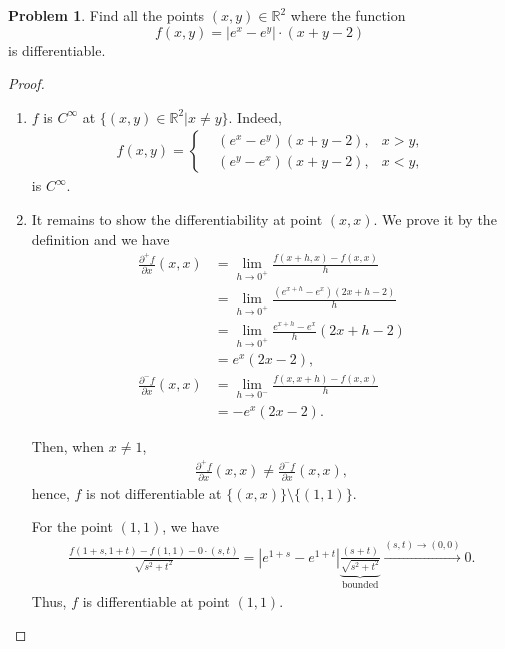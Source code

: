 \documentclass[11pt]{article}
\theoremstyle{definition}
\newtheorem{problem}{Problem}
\theoremstyle{definition}
\begin{document}
\medskip

\begin{problem}
Find all the points $(x,y)\in\mathbb{R}^2$ where the function
$$
f(x,y)=|e^x-e^y|\cdot(x+y-2)
$$
is differentiable.
\end{problem}
\begin{proof}
~\begin{enumerate}[label=(\arabic*)]
    \item $f$ is $C^\infty$ at $\{(x,y) \in \mathbb{R}^2| x \neq y\}$. Indeed, 
    \begin{align*}
        f(x,y) = \left\{
        \begin{aligned}
            & \left(e^x - e^y\right)(x+y-2), & x > y,\\
            & \left(e^y - e^x\right)(x+y-2), & x < y,
        \end{aligned}
        \right.
    \end{align*}
    is $C^\infty$. 
    
    \item It remains to show the differentiability at point $(x,x)$. We prove it by the definition and we have
    \begin{align*}
        \frac{\partial^+ f}{\partial x}(x,x) & = \lim_{h\to 0^+} \frac{f(x+h,x) - f(x,x)}{h} \\
        & = \lim_{h\to 0^+} \frac{\left(e^{x+h} - e^x\right)(2x+h-2)}{h} \\
        & = \lim_{h\to 0^+} \frac{e^{x+h} - e^x}{h} (2x+h-2) \\
        & = e^x (2x-2), \\
        \frac{\partial^- f}{\partial x}(x,x) & = \lim_{h\to 0^-} \frac{f(x,x+h) - f(x,x)}{h} \\
        & = - e^x (2x-2).
    \end{align*}
    
    Then, when $x\neq 1$,
    \begin{align*}
        \frac{\partial^+ f}{\partial x}(x,x) \neq \frac{\partial^- f}{\partial x}(x,x),
    \end{align*}
    hence, $f$ is not differentiable at $\{(x,x)\}\setminus \{(1,1)\}$.
    
    For the point $(1,1)$, we have 
    \begin{align*}
        \frac{f(1+s,1+t) - f(1,1) - 0\cdot (s,t)}{\sqrt{s^2+t^2}} = \left|e^{1+s} - e^{1+t}\right| \underbrace{\frac{ (s+t)}{\sqrt{s^2+t^2}}}_{\text{bounded}} \xrightarrow{(s,t)\to (0,0)} 0.
    \end{align*}
    Thus, $f$ is differentiable at point $(1,1)$.
\end{enumerate}
\end{proof}
\end{document}
